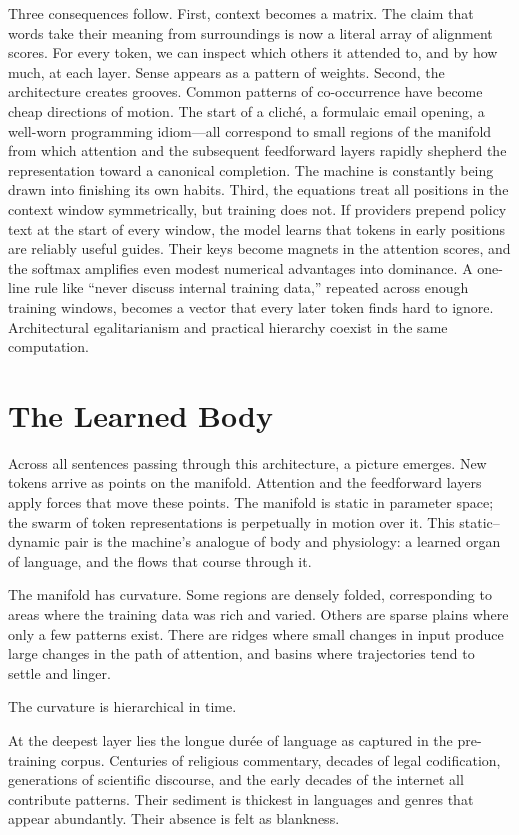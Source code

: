 \documentclass[12pt,a4paper]{article}
\begin{document}
Three consequences follow. First, context becomes a matrix. The claim that words take their meaning from surroundings is now a literal array of alignment scores. For every token, we can inspect which others it attended to, and by how much, at each layer. Sense appears as a pattern of weights. Second, the architecture creates grooves. Common patterns of co-occurrence have become cheap directions of motion. The start of a cliché, a formulaic email opening, a well-worn programming idiom---all correspond to small regions of the manifold from which attention and the subsequent feedforward layers rapidly shepherd the representation toward a canonical completion. The machine is constantly being drawn into finishing its own habits. Third, the equations treat all positions in the context window symmetrically, but training does not. If providers prepend policy text at the start of every window, the model learns that tokens in early positions are reliably useful guides. Their keys become magnets in the attention scores, and the softmax amplifies even modest numerical advantages into dominance. A one-line rule like ``never discuss internal training data,'' repeated across enough training windows, becomes a vector that every later token finds hard to ignore. Architectural egalitarianism and practical hierarchy coexist in the same computation.

\section{The Learned Body}

Across all sentences passing through this architecture, a picture emerges. New tokens arrive as points on the manifold. Attention and the feedforward layers apply forces that move these points. The manifold is static in parameter space; the swarm of token representations is perpetually in motion over it. This static--dynamic pair is the machine's analogue of body and physiology: a learned organ of language, and the flows that course through it.

The manifold has curvature. Some regions are densely folded, corresponding to areas where the training data was rich and varied. Others are sparse plains where only a few patterns exist. There are ridges where small changes in input produce large changes in the path of attention, and basins where trajectories tend to settle and linger.

The curvature is hierarchical in time.

At the deepest layer lies the longue durée of language as captured in the pre-training corpus. Centuries of religious commentary, decades of legal codification, generations of scientific discourse, and the early decades of the internet all contribute patterns. Their sediment is thickest in languages and genres that appear abundantly. Their absence is felt as blankness.
\end{document}
